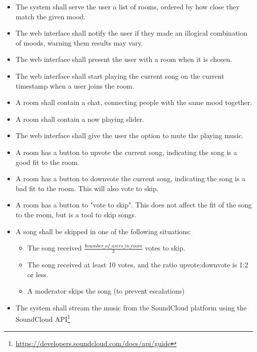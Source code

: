 \begin{itemize}
\item The system shall serve the user a list of rooms, ordered by how close they match the given mood.

\item The web interface shall notify the user if they made an illogical combination of moods, warning them results may vary.

\item The web interface shall present the user with a room when it is chosen.

\item The web interface shall start playing the current song on the current timestamp when a user joins the room.

\item A room shall contain a chat, connecting people with the same mood together.

\item A room shall contain a now playing slider.

\item The web interface shall give the user the option to mute the playing music.

\item A room has a button to upvote the current song, indicating the song is a good fit to the room.

\item A room has a button to downvote the current song, indicating the song is a bad fit to the room. This will also vote to skip.

\item A room has a button to "vote to skip". This does not affect the fit of the song to the room, but is a tool to skip songs.

\item A song shall be skipped in one of the following situations:
	\begin{itemize}
	\item The song received $\frac{\$number\_of\_users\_in\_room}{3}$ votes to skip.
	\item The song received at least 10 votes, and the ratio upvote:downvote is 1:2 or less.
	\item A moderator skips the song (to prevent escalations)
	\end{itemize}
	
\item The system shall stream the music from the SoundCloud platform using the SoundCloud API\footnote{\url{https://developers.soundcloud.com/docs/api/guide}}


\end{itemize}
